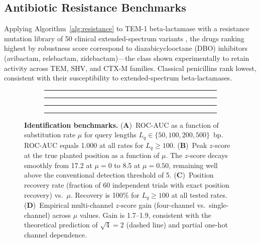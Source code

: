 \documentclass[twocolumn,11pt,a4paper]{article}
\theoremstyle{definition}
\theoremstyle{remark}
\begin{document}
\subsection{Antibiotic Resistance Benchmarks}
\label{subsec:resist_bench}

Applying Algorithm~\ref{alg:resistance} to TEM-1 beta-lactamase with a
resistance mutation library of 50 clinical extended-spectrum variants
\citep{bush2010}, the drugs ranking highest by robustness score correspond to
diazabicyclooctane (DBO) inhibitors (avibactam, relebactam, zidebactam)---the
class shown experimentally to retain activity across TEM, SHV, and CTX-M
families. Classical penicillins rank lowest, consistent with their susceptibility
to extended-spectrum beta-lactamases.

\begin{figure}[t]
\centering
\begin{subfigure}[b]{0.23\textwidth}
  \rule{\textwidth}{0.6\textwidth}
  \caption{}
  \label{fig:id_auc}
\end{subfigure}
\hfill
\begin{subfigure}[b]{0.23\textwidth}
  \rule{\textwidth}{0.6\textwidth}
  \caption{}
  \label{fig:id_zscore}
\end{subfigure}
\hfill
\begin{subfigure}[b]{0.23\textwidth}
  \rule{\textwidth}{0.6\textwidth}
  \caption{}
  \label{fig:id_recovery}
\end{subfigure}
\hfill
\begin{subfigure}[b]{0.23\textwidth}
  \rule{\textwidth}{0.6\textwidth}
  \caption{}
  \label{fig:id_gain}
\end{subfigure}
\caption{\textbf{Identification benchmarks.}
(\textbf{A})~ROC-AUC as a function of substitution rate $\mu$ for query
lengths $L_q \in \{50, 100, 200, 500\}$~bp. ROC-AUC equals 1.000 at all rates
for $L_q \geq 100$.
(\textbf{B})~Peak $z$-score at the true planted position as a function of $\mu$.
The $z$-score decays smoothly from 17.2 at $\mu = 0$ to 8.5 at $\mu = 0.50$,
remaining well above the conventional detection threshold of 5.
(\textbf{C})~Position recovery rate (fraction of 60 independent trials with
exact position recovery) vs.\ $\mu$. Recovery is 100\% for $L_q \geq 100$ at
all tested rates.
(\textbf{D})~Empirical multi-channel $z$-score gain (four-channel vs.\
single-channel) across $\mu$ values. Gain is 1.7--1.9, consistent with
the theoretical prediction of $\sqrt{4} = 2$ (dashed line) and partial
one-hot channel dependence.}
\label{fig:identification}
\end{figure}
\end{document}

